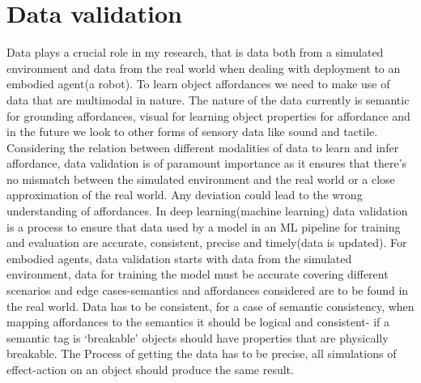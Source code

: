 \documentclass[11pt]{article}
\begin{document}
\section{Data validation}
Data plays a crucial role in my research, that is data both from a simulated environment and data from the real world when dealing with deployment to an embodied agent(a robot). To learn object affordances we need to make use of data that are multimodal in nature. The nature of the data currently is semantic for grounding affordances, visual for learning object properties for affordance and in the future we look to other forms of sensory data like sound and tactile. Considering the relation between different modalities of data to learn and infer affordance, data validation is of paramount importance as it ensures that there’s no mismatch between the simulated environment and the real world or a close approximation of the real world. Any deviation could lead to the wrong understanding of affordances.  In deep learning(machine learning) data validation is a process to ensure that data used by a model in an ML pipeline for training and evaluation are accurate, consistent, precise and timely(data is updated)\cite{breck2019data}. For embodied agents, data validation starts with data from the simulated environment, data for training the model must be accurate covering different scenarios and edge cases-semantics and affordances considered are to be found in the real world. Data has to be consistent, for a case of semantic consistency, when mapping affordances to the semantics it should be logical and consistent- if a semantic tag is ‘breakable’ objects should have properties that are physically breakable. The Process of getting the data has to be precise, all simulations of effect-action on an object should produce the same result. 
\end{document}
